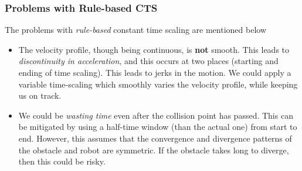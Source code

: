 \subsubsection*{Problems with Rule-based CTS}

The problems with \emph{rule-based} constant time scaling are mentioned below

\begin{itemize}
    \item The velocity profile, though being continuous, is \textbf{not} smooth. This leads to \emph{discontinuity in acceleration}, and this occurs at two places (starting and ending of time scaling). This leads to jerks in the motion. We could apply a variable time-scaling which smoothly varies the velocity profile, while keeping us on track.
    \item We could be \emph{wasting time} even after the collision point has passed. This can be mitigated by using a half-time window (than the actual one) from start to end. However, this assumes that the convergence and divergence patterns of the obstacle and robot are symmetric. If the obstacle takes long to diverge, then this could be risky.
\end{itemize}
